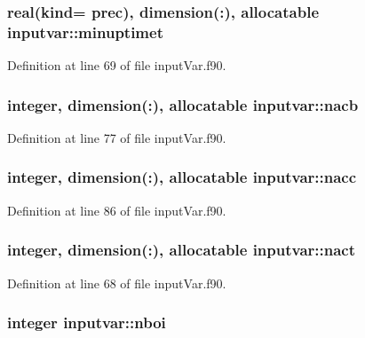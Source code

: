 \hypertarget{classinputvar_a90d0b599ed6468fc322cf2fbd6b4ec95}{
\subsubsection[{minuptimet}]{\setlength{\rightskip}{0pt plus 5cm}real(kind= prec), dimension(\-:), allocatable inputvar\-::minuptimet}}\label{classinputvar_a90d0b599ed6468fc322cf2fbd6b4ec95}


Definition at line 69 of file input\-Var.\-f90.

\hypertarget{classinputvar_ae517f545e388b4352b7941203efa8449}{
\subsubsection[{nacb}]{\setlength{\rightskip}{0pt plus 5cm}integer, dimension(\-:), allocatable inputvar\-::nacb}}\label{classinputvar_ae517f545e388b4352b7941203efa8449}


Definition at line 77 of file input\-Var.\-f90.

\hypertarget{classinputvar_a8e4bb497a3825e6f554e3268dd2bbd63}{
\subsubsection[{nacc}]{\setlength{\rightskip}{0pt plus 5cm}integer, dimension(\-:), allocatable inputvar\-::nacc}}\label{classinputvar_a8e4bb497a3825e6f554e3268dd2bbd63}


Definition at line 86 of file input\-Var.\-f90.

\hypertarget{classinputvar_aecb7a7ef500aee2174166b23b5c72e2a}{
\subsubsection[{nact}]{\setlength{\rightskip}{0pt plus 5cm}integer, dimension(\-:), allocatable inputvar\-::nact}}\label{classinputvar_aecb7a7ef500aee2174166b23b5c72e2a}


Definition at line 68 of file input\-Var.\-f90.

\hypertarget{classinputvar_a168bc1dcb73e68b3620991b6494f3797}{
\subsubsection[{nboi}]{\setlength{\rightskip}{0pt plus 5cm}integer inputvar\-::nboi}}\label{classinputvar_a168bc1dcb73e68b3620991b6494f3797}


